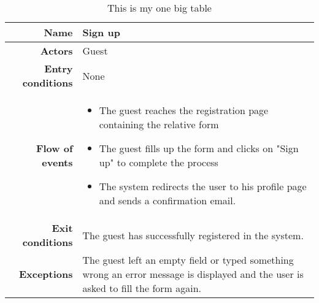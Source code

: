
\begin{table}

\begin{tabular}{r|p{7cm}}
\bf\large Name&\bf\large Sign up\\
\hline
\hline
\bf Actors&Guest\\
\hline
\bf Entry conditions&None\\
\hline
\bf Flow of events&
\begin{itemize}
\item The guest reaches the registration page containing the relative form
\item The guest fills up the form and clicks on "Sign up" to complete the process
\item The system redirects the user to his profile page and sends a confirmation email.
\end{itemize}
\\
\hline
\bf Exit conditions&The guest has successfully registered in the system. \\
\hline
\bf Exceptions&The guest left an empty field or typed
 something wrong an error message is displayed 
 and the user is asked to fill the form again.\\
\hline

\end{tabular}
\caption{This is my one big table} \label{tab:signup}
\end{table}
